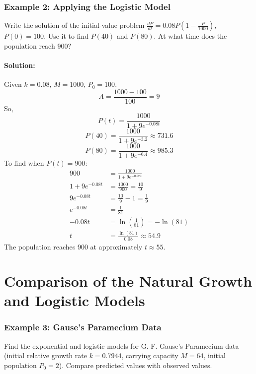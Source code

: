 \documentclass{article}
\begin{document}
\subsubsection*{Example 2: Applying the Logistic Model}
Write the solution of the initial-value problem $\frac{dP}{dt} = 0.08P\left(1 - \frac{P}{1000}\right)$, $P(0) = 100$. Use it to find $P(40)$ and $P(80)$. At what time does the population reach 900?

\paragraph{Solution:}
Given $k = 0.08$, $M = 1000$, $P_0 = 100$.
\[A = \frac{1000 - 100}{100} = 9\]
So,
\[P(t) = \frac{1000}{1 + 9e^{-0.08t}}\]
\[P(40) = \frac{1000}{1 + 9e^{-3.2}} \approx 731.6\]
\[P(80) = \frac{1000}{1 + 9e^{-6.4}} \approx 985.3\]
To find when $P(t) = 900$:
\begin{align*}
900 &= \frac{1000}{1 + 9e^{-0.08t}} \\
1 + 9e^{-0.08t} &= \frac{1000}{900} = \frac{10}{9} \\
9e^{-0.08t} &= \frac{10}{9} - 1 = \frac{1}{9} \\
e^{-0.08t} &= \frac{1}{81} \\
-0.08t &= \ln\left(\frac{1}{81}\right) = -\ln(81) \\
t &= \frac{\ln(81)}{0.08} \approx 54.9
\end{align*}
The population reaches 900 at approximately $t \approx 55$.

\section*{Comparison of the Natural Growth and Logistic Models}

\subsubsection*{Example 3: Gause's Paramecium Data}
Find the exponential and logistic models for G. F. Gause's Paramecium data (initial relative growth rate $k = 0.7944$, carrying capacity $M = 64$, initial population $P_0 = 2$). Compare predicted values with observed values.
\end{document}
